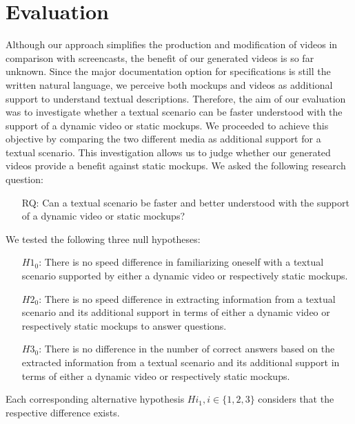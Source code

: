 \documentclass[conference]{IEEEtran}
\begin{document}
\section{Evaluation}
\label{ch:evaluation}
Although our approach simplifies the production and modification of videos in 
comparison with screencasts, the benefit of our generated videos is so far 
unknown. Since the major documentation option for specifications is still the 
written natural language, we perceive both mockups and videos as additional 
support to understand textual descriptions. Therefore, the aim of our 
evaluation was to investigate whether a textual scenario can be faster 
understood with the support of a dynamic video or static mockups. We proceeded 
to achieve this objective by comparing the two different media as additional 
support for a textual scenario. This investigation allows us to judge whether 
our generated videos provide a benefit against static mockups. We asked the 
following research question:

\begin{itemize}[\settowidth{\labelwidth}{RQ:}]
\item[RQ:] Can a textual scenario be faster and better understood with the 
support of a dynamic video or static mockups?
\end{itemize}
We tested the following three null hypotheses:

\begin{itemize}[]
\item[$H1_{0}$:] There is no speed difference in familiarizing oneself with a 
textual scenario supported by either a dynamic video or respectively static 
mockups.

\item[$H2_{0}$:] There is no speed difference in extracting information from a 
textual scenario and its additional support in terms of either a dynamic video 
or respectively static mockups to answer questions.

\item[$H3_{0}$:] There is no difference in the number of correct answers based 
on the extracted information from a textual scenario and its additional support 
in terms of either a dynamic video or respectively static mockups.
\end{itemize}

Each corresponding alternative hypothesis $Hi_{1}, i \in \{1,2,3\}$ considers 
that the respective difference exists.
\end{document}
